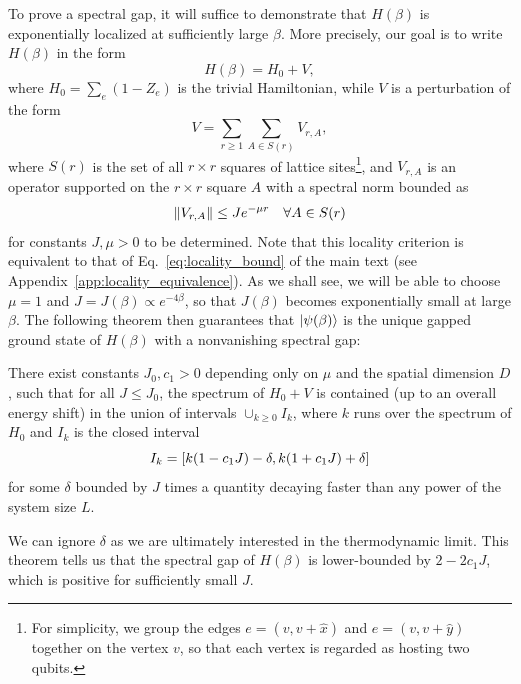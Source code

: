 To prove a spectral gap, it will suffice to demonstrate that $H(\beta)$ is exponentially localized at sufficiently large $\beta$. More precisely, our goal is to write $H(\beta)$ in the form
\begin{equation}
\label{eq:hastsings_1}
    H(\beta) = H_0 + V ,
\end{equation}
where $H_0 = \sum_e (1 - Z_e)$ is the trivial Hamiltonian, while $V$ is a perturbation of the form
\begin{equation}
\label{eq:hastings_2}
    V = \sum_{r \geq 1} \sum_{A \in S(r)} V_{r,A} ,
\end{equation}
where $S(r)$ is the set of all $r \times r$ squares of lattice sites\footnote{For simplicity, we group the edges $e = (v, v + \hat{x})$ and $e = (v, v + \hat{y})$ together on the vertex $v$, so that each vertex is regarded as hosting two qubits.}, and $V_{r, A}$ is an operator supported on the $r \times r$ square $A$ with a spectral norm bounded as
\begin{equation}
\label{eq:hastings_3}
    \norm{V_{r, A}} \leq J e^{-\mu r} \quad \forall A \in S(r)
\end{equation}
for constants $J, \mu > 0$ to be determined. Note that this locality criterion is equivalent to that of Eq.~\eqref{eq:locality_bound} of the main text (see Appendix~\ref{app:locality_equivalence}). As we shall see, we will be able to choose $\mu = 1$ and $J = J(\beta) \propto e^{-4\beta}$, so that $J(\beta)$ becomes exponentially small at large $\beta$. The following theorem then guarantees that $\ket{\psi(\beta)}$ is the unique gapped ground state of $H(\beta)$ with a nonvanishing spectral gap:
\begin{theorem}\label{theorem:BHM}
    There exist constants $J_0, c_1 > 0$ depending only on $\mu$ and the spatial dimension $D$, such that for all $J\leq J_0$, the spectrum of $H_0 + V$ is contained (up to an overall energy shift) in the union of intervals $\cup_{k\geq 0} I_k$, where $k$ runs over the spectrum of $H_0$ and $I_k$ is the closed interval
\begin{equation}
    I_k = \left[ k(1-c_1 J) - \delta, k(1+c_1 J) + \delta \right] 
\end{equation}
for some $\delta$ bounded by $J$ times a quantity decaying faster than any power of the system size $L$.
\end{theorem}
We can ignore $\delta$ as we are ultimately interested in the thermodynamic limit. This theorem tells us that the spectral gap of $H(\beta)$ is lower-bounded by $2 - 2 c_1 J$, which is positive for sufficiently small $J$.


